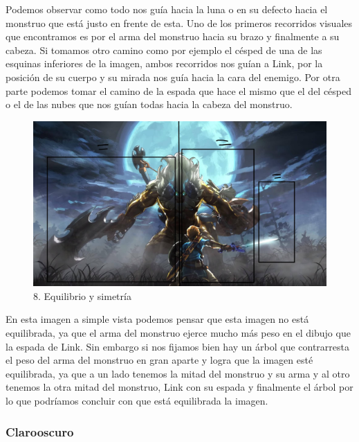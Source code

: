 \documentclass[12pt]{article}
\begin{document}
Podemos observar como todo nos guía hacia la luna o en su defecto hacia el monstruo que está justo en frente de esta. Uno de los primeros recorridos visuales que encontramos es por el arma del monstruo hacia su brazo y finalmente a su cabeza. Si tomamos otro camino como por ejemplo el césped de una de las esquinas inferiores de la imagen, ambos recorridos nos guían a Link, por la posición de su cuerpo y su mirada nos guía hacia la cara del enemigo. Por otra parte podemos tomar el camino de la espada que hace el mismo que el del césped o el de las nubes que nos guían todas hacia la cabeza del monstruo.

\begin{figure}[H]
      \centering
      \includegraphics[scale=0.25]{images/Raúl/Sección 8/Imagen 8 regla pesos.jpg}
      \caption{\small 8. Equilibrio y simetría}
    \end{figure}

En esta imagen a simple vista podemos pensar que esta imagen no está equilibrada, ya que el arma del monstruo ejerce mucho más peso en el dibujo que la espada de Link. Sin embargo si nos fijamos bien hay un árbol que contrarresta el peso del arma del monstruo en gran aparte y logra que la imagen esté equilibrada, ya que a un lado tenemos la mitad del monstruo y su arma y al otro tenemos la otra mitad del monstruo, Link con su espada y finalmente el árbol por lo que podríamos concluir con que está equilibrada la imagen. 


        \subsubsection{Clarooscuro}
\end{document}
